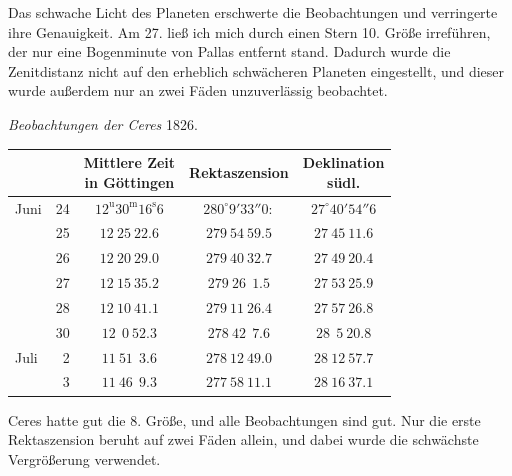 Das schwache Licht des Planeten erschwerte die Beobachtungen und verringerte ihre Genauigkeit. Am 27. ließ ich mich durch einen Stern 10. Größe irreführen, der nur eine Bogenminute von Pallas entfernt stand. Dadurch wurde die Zenitdistanz nicht auf den erheblich schwächeren Planeten eingestellt, und dieser wurde außerdem nur an zwei Fäden unzuverlässig beobachtet.


\begin{center}
\emph{Beobachtungen der Ceres} 1826.
\end{center}

\begin{center}
\begingroup\small\setlength{\tabcolsep}{4pt}
\begin{tabular}{lr|c|c|c}
 & & \shortstack{Mittlere Zeit\\in Göttingen} & Rektaszension & \shortstack{Deklination\\südl.} \\
\hline
Juni & 24 & $12^{\mathrm u}30^{\mathrm m}16^{\mathrm s}6$ & $280^\circ 9' 33''0:$ & $27^\circ 40' 54''6$ \\
 & 25 & $12\ 25\ 22.6$ & $279\ 54\ 59.5$ & $27\ 45\ 11.6$ \\
 & 26 & $12\ 20\ 29.0$ & $279\ 40\ 32.7$ & $27\ 49\ 20.4$ \\
 & 27 & $12\ 15\ 35.2$ & $279\ 26\ \ 1.5$ & $27\ 53\ 25.9$ \\
 & 28 & $12\ 10\ 41.1$ & $279\ 11\ 26.4$ & $27\ 57\ 26.8$ \\
 & 30 & $12\ \ 0\ 52.3$ & $278\ 42\ \ 7.6$ & $28\ \ 5\ 20.8$ \\
Juli & \ 2 & $11\ 51\ \ 3.6$ & $278\ 12\ 49.0$ & $28\ 12\ 57.7$ \\
 & \ 3 & $11\ 46\ \ 9.3$ & $277\ 58\ 11.1$ & $28\ 16\ 37.1$ \\
\end{tabular}
\endgroup
\end{center}

Ceres hatte gut die 8. Größe, und alle Beobachtungen sind gut. Nur die erste Rektaszension beruht auf zwei Fäden allein, und dabei wurde die schwächste Vergrößerung verwendet.
